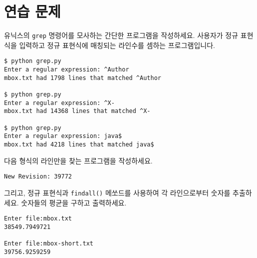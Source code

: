 \section{연습 문제}

\begin{ex}
유닉스의 {\tt grep} 명령어를 모사하는 간단한 프로그램을 작성하세요.
사용자가 정규 표현식을 입력하고 정규 표현식에 매칭되는 라인수를 셈하는 프로그램입니다.

\beforeverb
\begin{verbatim}
$ python grep.py
Enter a regular expression: ^Author
mbox.txt had 1798 lines that matched ^Author

$ python grep.py
Enter a regular expression: ^X-
mbox.txt had 14368 lines that matched ^X-

$ python grep.py
Enter a regular expression: java$
mbox.txt had 4218 lines that matched java$
\end{verbatim}
\afterverb
%
\end{ex}

\begin{ex}

다음 형식의 라인만을 찾는 프로그램을 작성하세요.

\verb"New Revision: 39772"

그리고, 정규 표현식과 {\tt findall()} 메쏘드를 사용하여 각 라인으로부터 숫자를 추출하세요.
숫자들의 평균을 구하고 출력하세요.

\beforeverb
\begin{verbatim}
Enter file:mbox.txt 
38549.7949721

Enter file:mbox-short.txt
39756.9259259
\end{verbatim}
\afterverb
%

\end{ex}

